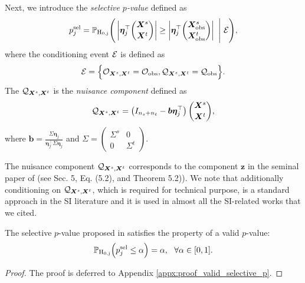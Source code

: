 Next, we introduce the \emph{selective $p$-value} defined as
%
\begin{align} \label{eq:selective_p}
	p^{\rm sel}_j = 
	\mathbb{P}_{\rm H_{0, j}} 
	\Bigg ( 
		\left | \bm \eta_j^\top {\bm X^s \choose \bm X^t } \right |
		\geq 
		\left | \bm \eta_j^\top {\bm X^s_{\rm obs} \choose \bm X^t_{\rm obs} } \right |
		~
		\Bigg | 
		~
		{\mathcal E}
	\Bigg ), 
\end{align}
%
where the conditioning event ${\mathcal E}$ is defined as
%
\begin{align} \label{eq:conditioning_event}
{\mathcal E} = \Big \{ 
	{\mathcal O}_{\bm X^s, \bm X^t}
	=
	{\mathcal O}_{\rm obs},
	{\mathcal Q}_{\bm X^s, \bm X^t}
	=
	{\mathcal Q}_{\rm obs}
\Big \}. 
\end{align}
%
The ${\mathcal Q}_{\bm X^s, \bm X^t}$ is the \emph{nuisance component} defined as 
%
\begin{align} \label{eq:q_and_b}
	{\mathcal Q}_{\bm X^s, \bm X^t} = 
	\left ( 
	I_{n_s + n_t} - 
	\bm b
	\bm \eta_j^\top \right ) 
	{\bm X^s \choose \bm X^t},
\end{align}
%
where 
$
	\bm b = \frac{\Sigma \bm \eta_j}
	{\bm \eta_j^\top \Sigma \bm \eta_j}
$
%
and 
$
\Sigma = 
\begin{pmatrix}
	\Sigma^s & 0 \\ 
	0 & \Sigma^t
\end{pmatrix}.
$

\begin{remark}
The nuisance component ${\mathcal Q}_{\bm X^s, \bm X^t}$ corresponds to
the component $\bm z$ in the seminal paper of \cite{lee2016exact} (see Sec. 5, Eq. (5.2), and Theorem 5.2)).
%
We note that additionally conditioning on ${\mathcal Q}_{\bm X^s, \bm X^t}$, which is required for technical purpose, is a standard approach in the SI literature and it is used in almost all the SI-related works that we cited.
%
\end{remark}

\begin{lemma} \label{lemma:valid_selective_p}
The selective $p$-value proposed in  satisfies the property of a valid $p$-value:
%
\begin{align*}
	\mathbb{P}_{\rm H_{0, j}}  \Big (
	p_j^{\rm sel} \leq \alpha
	\Big) = \alpha, ~~ \forall \alpha \in [0, 1].
\end{align*} 
\end{lemma}

\begin{proof}
The proof is deferred to Appendix \ref{appx:proof_valid_selective_p}.
\end{proof}

